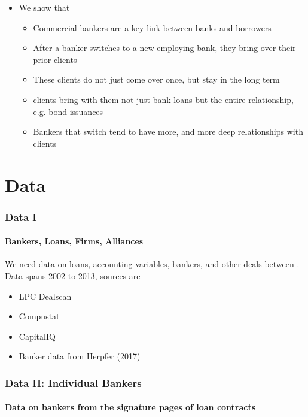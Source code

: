 \documentclass[]{beamer}
\begin{document}
\begin{frame}[t]
{\begin{frame}[t]
\begin{itemize}
		\item We show that
		\begin{itemize}
			\item Commercial bankers are a key link between banks and borrowers
			\item After a banker switches to a new employing bank, they bring over their prior clients
			\item These clients do not just come over once, but stay in the long term
			\item clients bring with them not just bank loans but the entire relationship, e.g. bond issuances
			\item Bankers that switch tend to have more, and more deep relationships with clients
		\end{itemize}

  	\end{itemize}
  \end{frame}
  
  
 
\section{Data}  
  
  \begin{frame}
    \frametitle{Data I}
       \framesubtitle{Bankers, Loans, Firms, Alliances}

We need data on loans, accounting variables, bankers, and other deals between . Data spans 2002 to 2013, sources are

    \begin{itemize}
    	\item LPC Dealscan
    	\item Compustat
    	\item CapitalIQ
    	\item Banker data from Herpfer (2017)
 
 	\end{itemize}
  \end{frame}



\begin{frame}[label=Data_I]
\frametitle{Data II: Individual Bankers}
\framesubtitle{Data on bankers from the signature pages of loan contracts} %



\end{frame}}
\end{frame}
\end{document}
